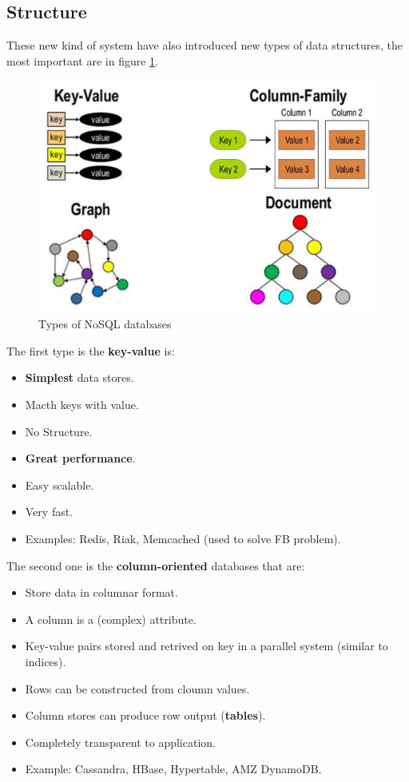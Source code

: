 \documentclass[12pt]{article}
\begin{document}
\subsection{Structure}
These new kind of system have also introduced new types of data structures, the most important are in figure \ref{fig:tnosql}.
\begin{figure}[H]
  \includegraphics[width=\linewidth]{images/tnosql.png}
  \caption{Types of NoSQL databases}
  \label{fig:tnosql}
\end{figure}
The first type is the \textbf{key-value} is:
\begin{itemize}
  \item \textbf{Simplest} data stores.
  \item Macth keys with value.
  \item No Structure.
  \item \textbf{Great performance}.
  \item Easy scalable.
  \item Very fast.
  \item Examples: Redis, Riak, Memcached (used to solve FB problem).
\end{itemize}
The second one is the \textbf{column-oriented} databases that are:
\begin{itemize}
  \item Store data in columnar format.
  \item A column is a (complex) attribute.
  \item Key-value pairs stored and retrived on key in a parallel system (similar to indices).
  \item Rows can be constructed from cloumn values.
  \item Column stores can produce row output (\textbf{tables}).
  \item Completely transparent to application.
  \item Example: Cassandra, HBase, Hypertable, AMZ DynamoDB.
\end{itemize}
\end{document}
